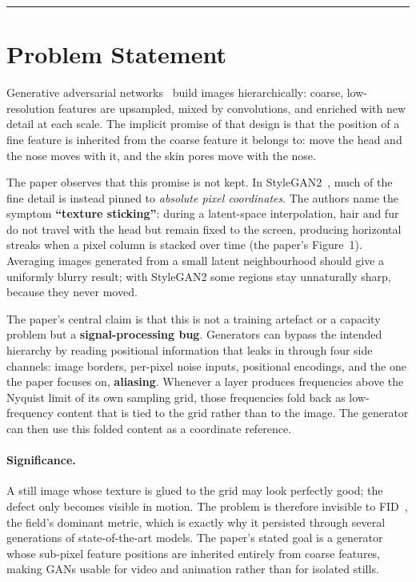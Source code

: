 \documentclass[11pt,a4paper]{article}
\begin{document}
\vspace{0.4em}
\hrule
\vspace{0.8em}

\section{Problem Statement}

Generative adversarial networks~\citep{goodfellow2014gan} build images
hierarchically: coarse, low-resolution features are upsampled, mixed by
convolutions, and enriched with new detail at each scale. The implicit promise of
that design is that the position of a fine feature is inherited from the coarse
feature it belongs to: move the head and the nose moves with it, and the skin
pores move with the nose.

The paper observes that this promise is not kept. In StyleGAN2~\citep{karras2020stylegan2},
much of the fine detail is instead pinned to \emph{absolute pixel coordinates}.
The authors name the symptom \textbf{``texture sticking''}: during a latent-space
interpolation, hair and fur do not travel with the head but remain fixed to the
screen, producing horizontal streaks when a pixel column is stacked over time
(the paper's Figure~1). Averaging images generated from a small latent
neighbourhood should give a uniformly blurry result; with StyleGAN2 some regions
stay unnaturally sharp, because they never moved.

The paper's central claim is that this is not a training artefact or a capacity
problem but a \textbf{signal-processing bug}. Generators can bypass the intended
hierarchy by reading positional information that leaks in through four side
channels: image borders, per-pixel noise inputs, positional encodings, and
the one the paper focuses on, \textbf{aliasing}. Whenever a layer produces
frequencies above the Nyquist limit of its own sampling grid, those frequencies
fold back as low-frequency content that is tied to the grid rather than to the
image. The generator can then use this folded content as a coordinate reference.

\paragraph{Significance.} A still image whose texture is glued to the grid may
look perfectly good; the defect only becomes visible in motion. The problem is
therefore invisible to FID~\citep{heusel2017fid}, the field's dominant metric,
which is exactly why it persisted through several generations of state-of-the-art
models. The paper's stated goal is a generator whose sub-pixel feature positions
are inherited entirely from coarse features, making GANs usable for video and
animation rather than for isolated stills.
\end{document}
